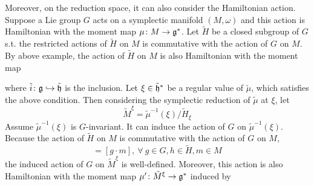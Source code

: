 \documentclass[a4paper,12pt]{article}
\begin{document}
	Moreover, on the reduction space, it can also consider the Hamiltonian action. Suppose a Lie group $G$ acts on a symplectic manifold $(M,\omega)$ and this action is Hamiltonian with the moment map $\mu \colon M \rightarrow \mathfrak{g}^*$. Let $\tilde{H}$ be a closed subgroup of $G$ s.t. the restricted actions of $\tilde{H}$ on $M$ is commutative with the action of $G$ on $M$. By above example, the action of $\tilde{H}$ on $M$ is also Hamiltonian with the moment map
	\begin{center}
	\end{center}
	where $\tilde{i} \colon \mathfrak{g} \hookrightarrow \tilde{\mathfrak{h}}$ is the inclusion. Let $\xi \in \tilde{\mathfrak{h}}^*$ be a regular value of $\tilde{\mu}$, which satisfies the above condition. Then considering the symplectic reduction of $\tilde{\mu}$ at $\xi$, let
	\begin{equation*}
		\tilde{M}^{\xi} = \tilde{\mu}^{-1}(\xi) / \tilde{H}_{\xi}
	\end{equation*}
	Assume $\tilde{\mu}^{-1}(\xi)$  is $G$-invariant. It can induce the action of $G$ on $\tilde{\mu}^{-1}(\xi)$. Because the action of $\tilde{H}$ on $M$ is commutative with the action of $G$ on $M$,
	\begin{equation*}
		[g \cdot h \cdot m] = [g \cdot m],~\forall~g \in G,h\in \tilde{H},m\in M
	\end{equation*}
	the induced action of $G$ on $\tilde{M}^{\xi}$ is well-defined. Moreover, this action is also Hamiltonian with the moment map ${\mu}^{\prime} \colon \tilde{M}^{\xi} \rightarrow \mathfrak{g}^*$ induced by
	\begin{center}
	\end{center}
	
\end{document}
